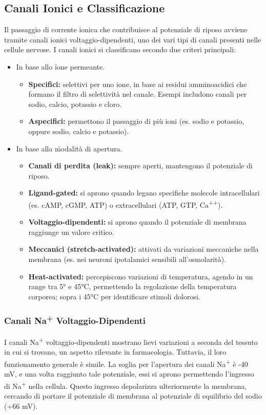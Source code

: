 \subsection{Canali Ionici e Classificazione}

Il passaggio di corrente ionica che contribuisce al potenziale di riposo avviene tramite canali ionici voltaggio-dipendenti, uno dei vari tipi di canali presenti nelle cellule nervose. I canali ionici si classificano secondo due criteri principali:

\begin{itemize}
    \item In base allo \h{ione permeante}.
    \begin{itemize}
        \item \textbf{Specifici:} selettivi per uno ione, in base ai residui amminoacidici che formano il filtro di selettività nel canale. Esempi includono canali per sodio, calcio, potassio e cloro.
        \item \textbf{Aspecifici:} permettono il passaggio di più ioni (es. sodio e potassio, oppure sodio, calcio e potassio).
    \end{itemize}
    \item In base alla \h{modalità di apertura}.
    \begin{itemize}
        \item \textbf{Canali di perdita (leak):} sempre aperti, mantengono il potenziale di riposo.
        \item \textbf{Ligand-gated:} si aprono quando legano specifiche molecole intracellulari (es. cAMP, cGMP, ATP) o extracellulari (ATP, GTP, Ca\textsuperscript{++}).
        \item \textbf{Voltaggio-dipendenti:} si aprono quando il potenziale di membrana raggiunge un valore critico.
        \item \textbf{Meccanici (stretch-activated):} attivati da variazioni meccaniche nella membrana (es. nei neuroni ipotalamici sensibili all'osmolarità).
        \item \textbf{Heat-activated:} percepiscono variazioni di temperatura, agendo in un range tra 5° e 45°C, permettendo la regolazione della temperatura corporea; sopra i 45°C per identificare stimoli dolorosi.
    \end{itemize}
\end{itemize}

\subsubsection{Canali Na\textsuperscript{+} Voltaggio-Dipendenti}
I canali Na\textsuperscript{+} voltaggio-dipendenti mostrano lievi variazioni a seconda del tessuto in cui si trovano, un aspetto rilevante in farmacologia. Tuttavia, il loro funzionamento generale è simile. La soglia per l'apertura dei canali Na\textsuperscript{+} è -40 mV, e una volta raggiunto tale potenziale, essi si aprono permettendo l'ingresso di Na\textsuperscript{+} nella cellula. Questo ingresso depolarizza ulteriormente la membrana, cercando di portare il potenziale di membrana al potenziale di equilibrio del sodio (+66 mV).

